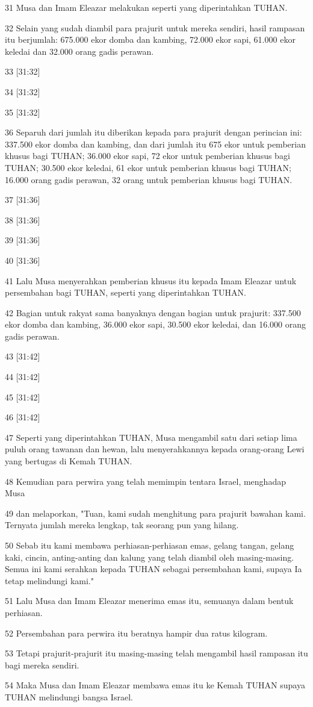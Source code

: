 \par 31 Musa dan Imam Eleazar melakukan seperti yang diperintahkan TUHAN.
\par 32 Selain yang sudah diambil para prajurit untuk mereka sendiri, hasil rampasan itu berjumlah: 675.000 ekor domba dan kambing, 72.000 ekor sapi, 61.000 ekor keledai dan 32.000 orang gadis perawan.
\par 33 [31:32]
\par 34 [31:32]
\par 35 [31:32]
\par 36 Separuh dari jumlah itu diberikan kepada para prajurit dengan perincian ini: 337.500 ekor domba dan kambing, dan dari jumlah itu 675 ekor untuk pemberian khusus bagi TUHAN; 36.000 ekor sapi, 72 ekor untuk pemberian khusus bagi TUHAN; 30.500 ekor keledai, 61 ekor untuk pemberian khusus bagi TUHAN; 16.000 orang gadis perawan, 32 orang untuk pemberian khusus bagi TUHAN.
\par 37 [31:36]
\par 38 [31:36]
\par 39 [31:36]
\par 40 [31:36]
\par 41 Lalu Musa menyerahkan pemberian khusus itu kepada Imam Eleazar untuk persembahan bagi TUHAN, seperti yang diperintahkan TUHAN.
\par 42 Bagian untuk rakyat sama banyaknya dengan bagian untuk prajurit: 337.500 ekor domba dan kambing, 36.000 ekor sapi, 30.500 ekor keledai, dan 16.000 orang gadis perawan.
\par 43 [31:42]
\par 44 [31:42]
\par 45 [31:42]
\par 46 [31:42]
\par 47 Seperti yang diperintahkan TUHAN, Musa mengambil satu dari setiap lima puluh orang tawanan dan hewan, lalu menyerahkannya kepada orang-orang Lewi yang bertugas di Kemah TUHAN.
\par 48 Kemudian para perwira yang telah memimpin tentara Israel, menghadap Musa
\par 49 dan melaporkan, "Tuan, kami sudah menghitung para prajurit bawahan kami. Ternyata jumlah mereka lengkap, tak seorang pun yang hilang.
\par 50 Sebab itu kami membawa perhiasan-perhiasan emas, gelang tangan, gelang kaki, cincin, anting-anting dan kalung yang telah diambil oleh masing-masing. Semua ini kami serahkan kepada TUHAN sebagai persembahan kami, supaya Ia tetap melindungi kami."
\par 51 Lalu Musa dan Imam Eleazar menerima emas itu, semuanya dalam bentuk perhiasan.
\par 52 Persembahan para perwira itu beratnya hampir dua ratus kilogram.
\par 53 Tetapi prajurit-prajurit itu masing-masing telah mengambil hasil rampasan itu bagi mereka sendiri.
\par 54 Maka Musa dan Imam Eleazar membawa emas itu ke Kemah TUHAN supaya TUHAN melindungi bangsa Israel.

